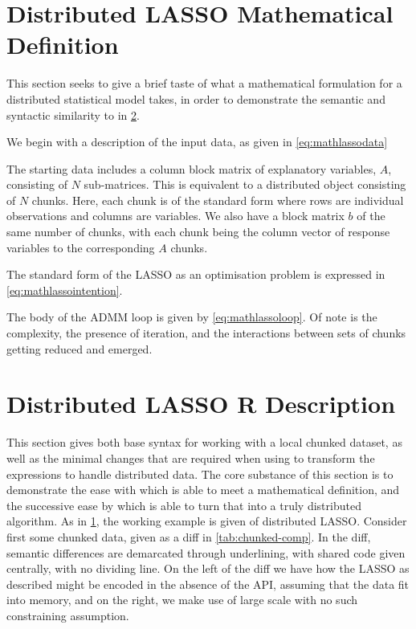 \section{Distributed LASSO Mathematical Definition}\label{sec:mathlasso}

This section seeks to give a brief taste of what a mathematical formulation for a distributed statistical model takes, in order to demonstrate the semantic and syntactic similarity to \lsr{} in \cref{sec:rlasso}.

We begin with a description of the input data, as given in \cref{eq:mathlassodata}


The starting data includes a column block matrix of explanatory variables, $A$, consisting of $N$ sub-matrices.
This is equivalent to a distributed object consisting of $N$ chunks.
Here, each chunk is of the standard form where rows are individual observations and columns are variables.
We also have a block matrix $b$ of the same number of chunks, with each chunk being the column vector of response variables to the corresponding $A$ chunks.

The standard form of the LASSO as an optimisation problem is expressed in \cref{eq:mathlassointention}.


The body of the ADMM loop is given by \cref{eq:mathlassoloop}.
Of note is the complexity, the presence of iteration, and the interactions between sets of chunks getting reduced and emerged.


\section{Distributed LASSO R Description}\label{sec:rlasso}

This section gives both base \R{} syntax for working with a local chunked dataset, as well as the minimal changes that are required when using \lsr{} to transform the expressions to handle distributed data.
The core substance of this section is to demonstrate the ease with which \R{} is able to meet a mathematical definition, and the successive ease by which \lsr{} is able to turn that into a truly distributed algorithm.
As in \cref{sec:mathlasso}, the working example is given of distributed LASSO.
Consider first some chunked data, given as a diff in \cref{tab:chunked-comp}.
In the diff, semantic differences are demarcated through underlining, with shared code given centrally, with no dividing line.
On the left of the diff we have how the LASSO as described might be encoded in the absence of the API, assuming that the data fit into memory, and on the right, we make use of large scale \R{} with no such constraining assumption.

